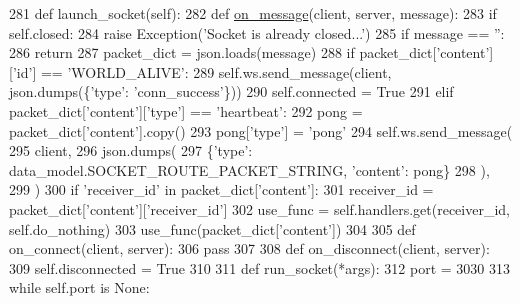 \begin{DoxyCode}
281     \textcolor{keyword}{def }launch\_socket(self):
282         \textcolor{keyword}{def }\hyperlink{namespaceparlai_1_1chat__service_1_1services_1_1browser__chat_1_1client_a01c1536b48e2f5badd2fe58ea02b9a5c}{on\_message}(client, server, message):
283             \textcolor{keywordflow}{if} self.closed:
284                 \textcolor{keywordflow}{raise} Exception(\textcolor{stringliteral}{'Socket is already closed...'})
285             \textcolor{keywordflow}{if} message == \textcolor{stringliteral}{''}:
286                 \textcolor{keywordflow}{return}
287             packet\_dict = json.loads(message)
288             \textcolor{keywordflow}{if} packet\_dict[\textcolor{stringliteral}{'content'}][\textcolor{stringliteral}{'id'}] == \textcolor{stringliteral}{'WORLD\_ALIVE'}:
289                 self.ws.send\_message(client, json.dumps(\{\textcolor{stringliteral}{'type'}: \textcolor{stringliteral}{'conn\_success'}\}))
290                 self.connected = \textcolor{keyword}{True}
291             \textcolor{keywordflow}{elif} packet\_dict[\textcolor{stringliteral}{'content'}][\textcolor{stringliteral}{'type'}] == \textcolor{stringliteral}{'heartbeat'}:
292                 pong = packet\_dict[\textcolor{stringliteral}{'content'}].copy()
293                 pong[\textcolor{stringliteral}{'type'}] = \textcolor{stringliteral}{'pong'}
294                 self.ws.send\_message(
295                     client,
296                     json.dumps(
297                         \{\textcolor{stringliteral}{'type'}: data\_model.SOCKET\_ROUTE\_PACKET\_STRING, \textcolor{stringliteral}{'content'}: pong\}
298                     ),
299                 )
300             \textcolor{keywordflow}{if} \textcolor{stringliteral}{'receiver\_id'} \textcolor{keywordflow}{in} packet\_dict[\textcolor{stringliteral}{'content'}]:
301                 receiver\_id = packet\_dict[\textcolor{stringliteral}{'content'}][\textcolor{stringliteral}{'receiver\_id'}]
302                 use\_func = self.handlers.get(receiver\_id, self.do\_nothing)
303                 use\_func(packet\_dict[\textcolor{stringliteral}{'content'}])
304 
305         \textcolor{keyword}{def }on\_connect(client, server):
306             \textcolor{keywordflow}{pass}
307 
308         \textcolor{keyword}{def }on\_disconnect(client, server):
309             self.disconnected = \textcolor{keyword}{True}
310 
311         \textcolor{keyword}{def }run\_socket(*args):
312             port = 3030
313             \textcolor{keywordflow}{while} self.port \textcolor{keywordflow}{is} \textcolor{keywordtype}{None}:

\end{DoxyCode}

